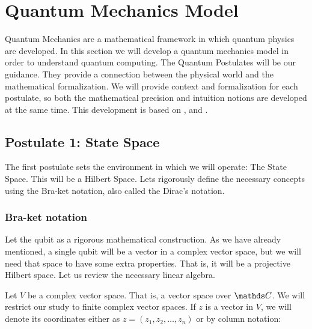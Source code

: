
\chapter{Quantum Mechanics Model}


Quantum Mechanics are a mathematical framework in which quantum physics are developed. In this section we will develop a quantum mechanics model in order to understand quantum computing. The Quantum Postulates will be our guidance. They provide a connection between the physical world and the mathematical formalization. We will provide context and formalization for each postulate, so both the mathematical precision and intuition notions are developed at the same time. This development is based on \cite{Nielsen2002}, \cite{Manzano2020} and \cite{Bayens2019}.


\section{Postulate 1: State Space}


The first postulate sets the environment in which we will operate: The State Space. This will be a Hilbert Space. Lets rigorously define the necessary concepts using the Bra-ket notation, also called the Dirac's notation.


\subsection{Bra-ket notation}


Let the qubit as a rigorous mathematical construction. As we have already mentioned, a single qubit will be a vector in a complex vector space, but we will need that space to have some extra properties. That is, it will be a projective Hilbert space. Let us review the necessary linear algebra.

Let $V$ be a complex vector space. That is, a vector space over $\C$. We will restrict our study to finite complex vector spaces. If $z$ is a vector in $V$, we will denote its coordinates either as $z = (z_1, z_2, \dotsc, z_n)$ or by column notation:


